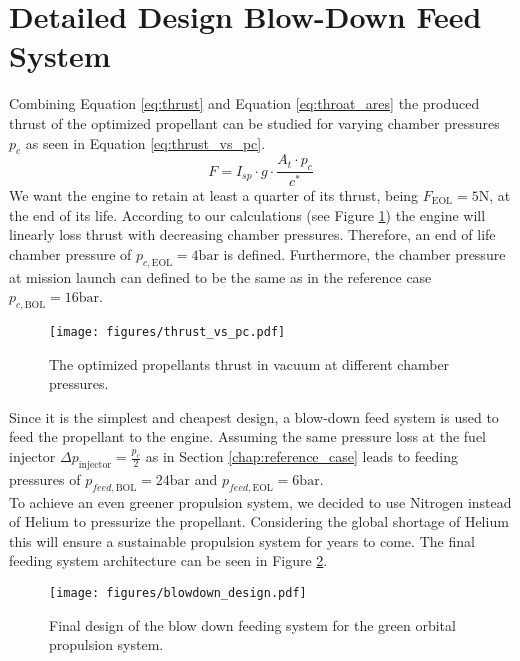 \documentclass[12pt]{article}
\begin{document}
\section{Detailed Design Blow-Down Feed System}
Combining Equation \ref{eq:thrust} and Equation \ref{eq:throat_ares} the produced thrust of the optimized propellant can be studied for varying chamber pressures $p_c$ as seen in Equation \ref{eq:thrust_vs_pc}.
\begin{equation}
	F = I_{sp} \cdot g \cdot \frac{A_t\cdot p_c}{c^*}
	\label{eq:thrust_vs_pc}
\end{equation}
We want the engine to retain at least a quarter of its thrust, being $F_{\text{EOL}}=5\text{N}$, at the end of its life. According to our calculations (see Figure \ref{fig:thrust_vs_pc}) the engine will linearly loss thrust with decreasing chamber pressures. Therefore, an end of life chamber pressure of $p_{c,\text{EOL}}=4\text{bar}$ is defined. Furthermore, the chamber pressure at mission launch can defined to be the same as in the reference case $p_{c,\text{BOL}}=16\text{bar}$.\\

\begin{figure}[h]
	\centering
	\texttt{[image: figures/thrust\_vs\_pc.pdf]}
	\caption{The optimized propellants thrust in vacuum at different chamber pressures.}
	\label{fig:thrust_vs_pc}
\end{figure}

Since it is the simplest and cheapest design, a blow-down feed system is used to feed the propellant to the engine. Assuming the same pressure loss at the fuel injector $\Delta p_{\text{injector}}= \frac{p_c}{2}$ as in Section \ref{chap:reference_case} leads to feeding pressures of $p_{feed,\text{BOL}}=24\text{bar}$ and $p_{feed,\text{EOL}}=6\text{bar}$.\\

To achieve an even greener propulsion system, we decided to use Nitrogen instead of Helium to pressurize the propellant. Considering the global shortage of Helium this will ensure a sustainable propulsion system for years to come. The final feeding system architecture can be seen in Figure \ref{fig:blowdown_design}.\\

\begin{figure}[h]
	\centering
	\texttt{[image: figures/blowdown\_design.pdf]}
	\caption{Final design of the blow down feeding system for the green orbital propulsion system.}
	\label{fig:blowdown_design}
\end{figure}
\end{document}
